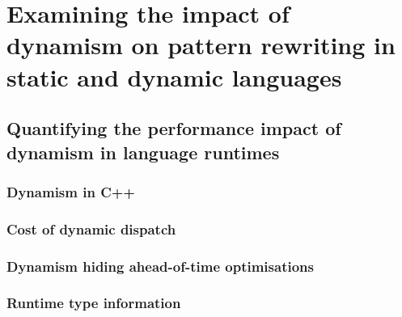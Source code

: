 

\chapter{Examining the impact of dynamism on pattern rewriting in static and dynamic languages}
\label{chap:dynamism-pattern-rewriting}

\section{Quantifying the performance impact of dynamism in language runtimes}


\subsection{Dynamism in C++}


\subsection{Cost of dynamic dispatch}




\subsection{Dynamism hiding ahead-of-time optimisations}





\subsection{Runtime type information}



